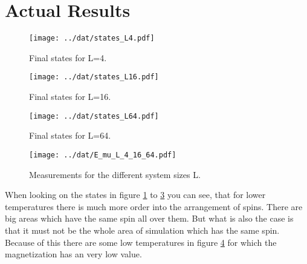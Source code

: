 \section{Actual Results}

\begin{figure}[ht]
	\centering
	\texttt{[image: ../dat/states\_L4.pdf]}
	\caption{
		Final states for L=4.
		}
	\label{L4}
\end{figure}

\begin{figure}[ht]
	\centering
	\texttt{[image: ../dat/states\_L16.pdf]}
	\caption{
		Final states for L=16.
	}
	\label{L16}
\end{figure}

\begin{figure}[ht]
	\centering
	\texttt{[image: ../dat/states\_L64.pdf]}
	\caption{
		Final states for L=64.
	}
	\label{L64}
\end{figure}

\begin{figure}[ht]
	\centering
	\texttt{[image: ../dat/E\_mu\_L\_4\_16\_64.pdf]}
	\caption{
		Measurements for the different system sizes L.
	}
	\label{mes}
\end{figure}

When looking on the states in figure \ref{L4} to \ref{L64} you can see, that for lower temperatures there is much more order into the arrangement of spins.
There are big areas which have the same spin all over them.
But what is also the case is that it must not be the whole area of simulation which has the same spin. 
Because of this there are some low temperatures in figure \ref{mes} for which the magnetization has an very low value.